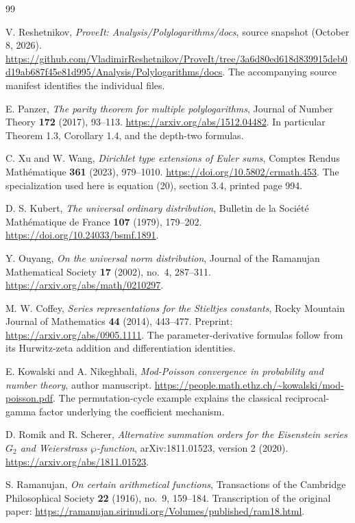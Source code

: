 \begin{thebibliography}{99}

V. Reshetnikov, \emph{ProveIt: Analysis/Polylogarithms/docs},
source snapshot
(October 8, 2026).
\url{https://github.com/VladimirReshetnikov/ProveIt/tree/3a6d80ed618d839915deb0d19ab687f45e81d995/Analysis/Polylogarithms/docs}.
The accompanying source manifest identifies the individual files.

E. Panzer, \emph{The parity theorem for multiple polylogarithms},
Journal of Number Theory \textbf{172} (2017), 93--113.
\url{https://arxiv.org/abs/1512.04482}.
In particular Theorem 1.3, Corollary 1.4, and the depth-two formulas.

C. Xu and W. Wang, \emph{Dirichlet type extensions of Euler sums},
Comptes Rendus Math\'ematique \textbf{361} (2023), 979--1010.
\url{https://doi.org/10.5802/crmath.453}.
The specialization used here is equation (20), section 3.4,
printed page 994.

D. S. Kubert, \emph{The universal ordinary distribution},
Bulletin de la Soci\'et\'e Math\'ematique de France
\textbf{107} (1979), 179--202.
\url{https://doi.org/10.24033/bsmf.1891}.

Y. Ouyang, \emph{On the universal norm distribution},
Journal of the Ramanujan Mathematical Society
\textbf{17} (2002), no.~4, 287--311.
\url{https://arxiv.org/abs/math/0210297}.

M. W. Coffey, \emph{Series representations for the Stieltjes constants},
Rocky Mountain Journal of Mathematics \textbf{44} (2014), 443--477.
Preprint: \url{https://arxiv.org/abs/0905.1111}.
The parameter-derivative formulas follow from its Hurwitz-zeta
addition and differentiation identities.

E. Kowalski and A. Nikeghbali,
\emph{Mod-Poisson convergence in probability and number theory},
author manuscript.
\url{https://people.math.ethz.ch/~kowalski/mod-poisson.pdf}.
The permutation-cycle example explains the classical reciprocal-gamma
factor underlying the coefficient mechanism.

D. Romik and R. Scherer,
\emph{Alternative summation orders for the Eisenstein series \(G_2\)
and Weierstrass \(\wp\)-function},
arXiv:1811.01523, version 2 (2020).
\url{https://arxiv.org/abs/1811.01523}.

S. Ramanujan, \emph{On certain arithmetical functions},
Transactions of the Cambridge Philosophical Society
\textbf{22} (1916), no.~9, 159--184.
Transcription of the original paper:
\url{https://ramanujan.sirinudi.org/Volumes/published/ram18.html}.


\end{thebibliography}
